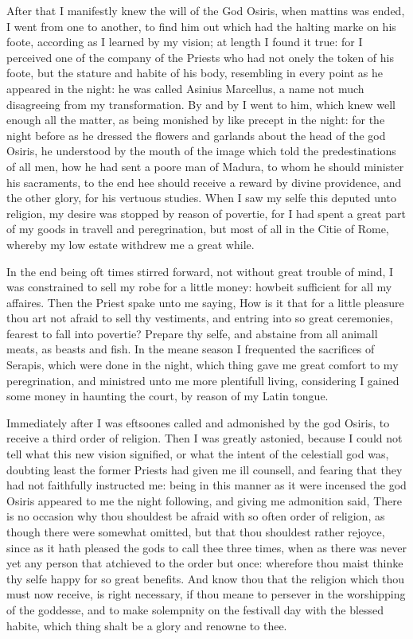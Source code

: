 After that I manifestly knew the will of the God Osiris, when mattins was
ended, I went from one to another, to find him out which had the halting marke
on his foote, according as I learned by my vision; at length I found it true:
for I perceived one of the company of the Priests who had not onely the token
of his foote, but the stature and habite of his body, resembling in every point
as he appeared in the night: he was called Asinius Marcellus, a name not much
disagreeing from my transformation. By and by I went to him, which knew well
enough all the matter, as being monished by like precept in the night: for the
night before as he dressed the flowers and garlands about the head of the god
Osiris, he understood by the mouth of the image which told the predestinations
of all men, how he had sent a poore man of Madura, to whom he should minister
his sacraments, to the end hee should receive a reward by divine providence,
and the other glory, for his vertuous studies. When I saw my selfe this deputed
unto religion, my desire was stopped by reason of povertie, for I had spent a
great part of my goods in travell and peregrination, but most of all in the
Citie of Rome, whereby my low estate withdrew me a great while.

In the end being oft times stirred forward, not without great trouble of mind,
I was constrained to sell my robe for a little money: howbeit sufficient for
all my affaires. Then the Priest spake unto me saying, How is it that for a
little pleasure thou art not afraid to sell thy vestiments, and entring into so
great ceremonies, fearest to fall into povertie? Prepare thy selfe, and
abstaine from all animall meats, as beasts and fish. In the meane season I
frequented the sacrifices of Serapis, which were done in the night, which thing
gave me great comfort to my peregrination, and ministred unto me more
plentifull living, considering I gained some money in haunting the court, by
reason of my Latin tongue.

Immediately after I was eftsoones called and admonished by the god Osiris, to
receive a third order of religion. Then I was greatly astonied, because I could
not tell what this new vision signified, or what the intent of the celestiall
god was, doubting least the former Priests had given me ill counsell, and
fearing that they had not faithfully instructed me: being in this manner as it
were incensed the god Osiris appeared to me the night following, and giving me
admonition said, There is no occasion why thou shouldest be afraid with so
often order of religion, as though there were somewhat omitted, but that thou
shouldest rather rejoyce, since as it hath pleased the gods to call thee three
times, when as there was never yet any person that atchieved to the order but
once: wherefore thou maist thinke thy selfe happy for so great benefits. And
know thou that the religion which thou must now receive, is right necessary, if
thou meane to persever in the worshipping of the goddesse, and to make
solempnity on the festivall day with the blessed habite, which thing shalt be a
glory and renowne to thee.

